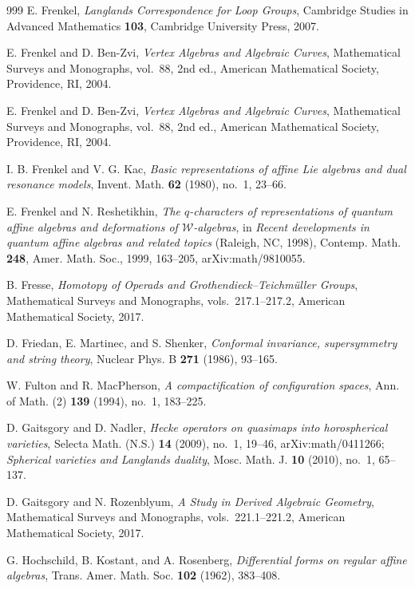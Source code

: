 \begin{thebibliography}{999}
E. Frenkel, \emph{Langlands Correspondence for Loop Groups}, Cambridge Studies in Advanced Mathematics \textbf{103}, Cambridge University Press, 2007.

E. Frenkel and D. Ben-Zvi, \emph{Vertex Algebras and Algebraic Curves}, Mathematical Surveys and Monographs, vol.~88, 2nd ed., American Mathematical Society, Providence, RI, 2004.

E. Frenkel and D. Ben-Zvi, \emph{Vertex Algebras and Algebraic Curves}, Mathematical Surveys and Monographs, vol.~88, 2nd ed., American Mathematical Society, Providence, RI, 2004.

I. B. Frenkel and V. G. Kac, \emph{Basic representations of affine Lie algebras and dual resonance models}, Invent. Math. \textbf{62} (1980), no.~1, 23--66.

E. Frenkel and N. Reshetikhin, \emph{The $q$-characters of representations of quantum affine algebras and deformations of $\mathcal{W}$-algebras}, in \emph{Recent developments in quantum affine algebras and related topics} (Raleigh, NC, 1998), Contemp. Math. \textbf{248}, Amer. Math. Soc., 1999, 163--205, arXiv:math/9810055.

B. Fresse, \emph{Homotopy of Operads and Grothendieck--Teichm\"uller Groups}, Mathematical Surveys and Monographs, vols.~217.1--217.2, American Mathematical Society, 2017.

D. Friedan, E. Martinec, and S. Shenker, \emph{Conformal invariance, supersymmetry and string theory}, Nuclear Phys. B \textbf{271} (1986), 93--165.

W. Fulton and R. MacPherson, \emph{A compactification of configuration spaces}, Ann. of Math. (2) \textbf{139} (1994), no.~1, 183--225.

D. Gaitsgory and D. Nadler, \emph{Hecke operators on quasimaps into horospherical varieties}, Selecta Math. (N.S.) \textbf{14} (2009), no.~1, 19--46, arXiv:math/0411266; \emph{Spherical varieties and Langlands duality}, Mosc. Math. J. \textbf{10} (2010), no.~1, 65--137.

D. Gaitsgory and N. Rozenblyum, \emph{A Study in Derived Algebraic Geometry}, Mathematical Surveys and Monographs, vols.~221.1--221.2, American Mathematical Society, 2017.

G. Hochschild, B. Kostant, and A. Rosenberg, \emph{Differential forms on regular affine algebras}, Trans. Amer. Math. Soc. \textbf{102} (1962), 383--408.


\end{thebibliography}
